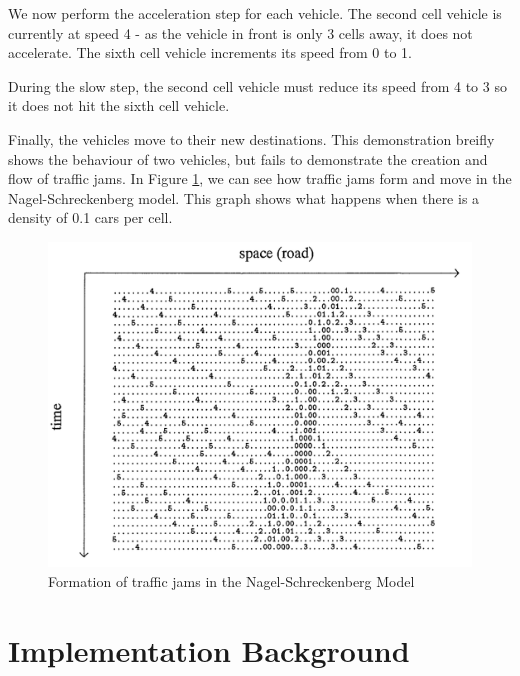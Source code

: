 \documentclass[ %
                    author={Alexander Hill},
                supervisor={Dr. Benjamin Sach},
                    degree={MEng},
                     title={MARMOSET},
                  subtitle={Multi-Agent Route Management using Online Simulation for Efficient Transportation},
                      type={research},
                      year={2016} ]{dissertation}
\begin{document}
We now perform the acceleration step for each vehicle. The second cell vehicle is
currently at speed 4 - as the vehicle in front is only 3 cells away, it does not
accelerate. The sixth cell vehicle increments its speed from 0 to 1.

During the slow step, the second cell vehicle must reduce its speed from 4 to 3
so it does not hit the sixth cell vehicle.

\begin{figure}[!h]
\centering
{}
\end{figure}

Finally, the vehicles move to their new destinations. This demonstration breifly
shows the behaviour of two vehicles, but fails to demonstrate the creation and
flow of traffic jams. In Figure \ref{nagel-demo}, we can see how traffic jams
form and move in the Nagel-Schreckenberg model. This graph shows what happens
when there is a density of 0.1 cars per cell.

\begin{figure}[h]
    \centering
    \includegraphics[scale=0.4]{nagel}
    \caption{Formation of traffic jams in the Nagel-Schreckenberg Model}\label{nagel-demo}
\end{figure}

\section{Implementation Background}
\end{document}
